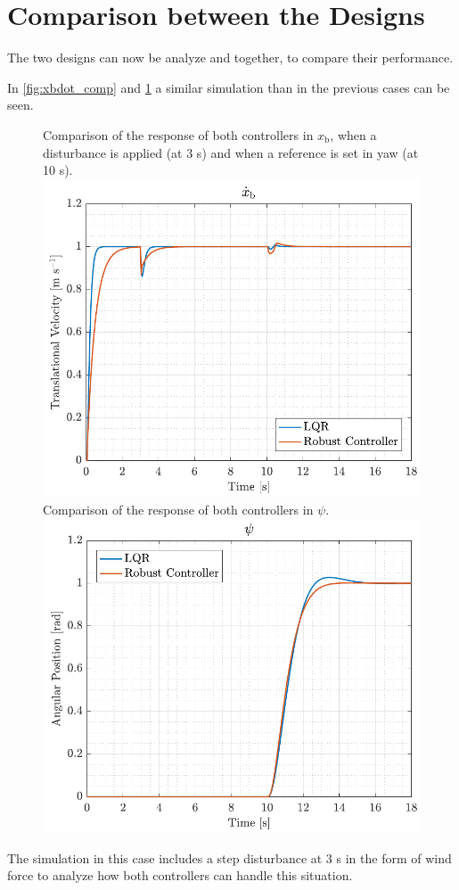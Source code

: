 \section{Comparison between the Designs}\label{sec:comparison}
The two designs can now be analyze and together, to compare their performance.

In \autoref{fig:xbdot_comp} and \ref{fig:yaw_comp} a similar simulation than in the previous cases can be seen.
\begin{figure}[H]
    \captionbox 
    {   
        Comparison of the response of both controllers in $x_\mathrm{b}$, when a disturbance is applied (at 3 s) and when a reference is set in yaw (at 10 s).
        \label{fig:xbdot_comp}
    }                                                                 
    {                                                                  
        \includegraphics[width=.45\textwidth]{figures/xbdot_comp}         
    }                                                                    
    \hspace{5pt}                                                          
    \captionbox  
    {      
        Comparison of the response of both controllers in $\psi$.
        \label{fig:yaw_comp}
    }                                                                          
    {
        \includegraphics[width=.45\textwidth]{figures/yaw_comp}
    }
\end{figure}

The simulation in this case includes a step disturbance at 3 s in the form of wind force to analyze how both controllers can handle this situation.

